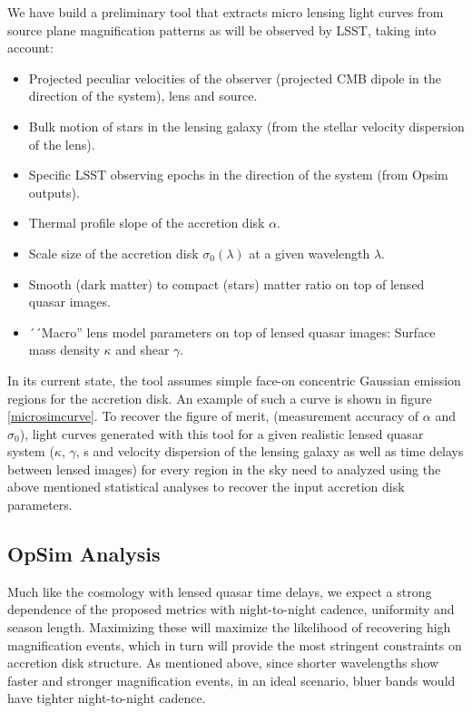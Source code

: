 We have build a preliminary tool that extracts micro lensing light curves from source plane magnification patterns as will be observed by LSST, taking into account:
\begin{itemize}
\item Projected peculiar velocities of the observer (projected CMB dipole in the direction of the system), lens and source.
\item Bulk motion of stars in the lensing galaxy (from the stellar velocity dispersion of the lens).
\item Specific LSST observing epochs in the direction of the system (from Opsim outputs).
\item Thermal profile slope of the accretion disk $\alpha$.
\item Scale size of the accretion disk $\sigma_{0}(\lambda)$ at a given wavelength $\lambda$.
\item Smooth (dark matter) to compact (stars) matter ratio on top of lensed quasar images.
\item ´´Macro'' lens model parameters on top of lensed quasar images: Surface mass density $\kappa$ and shear $\gamma$.
\end{itemize}

\noindent In its current state, the tool assumes simple face-on concentric Gaussian emission regions for the accretion disk. An example of such a curve is shown in figure \ref{microsimcurve}. To recover the figure of merit, (measurement accuracy of $\alpha$ and $\sigma_0$), light curves generated with this tool for a given realistic lensed quasar system ($\kappa$, $\gamma$, s and velocity dispersion of the lensing galaxy as well as time delays between lensed images) for every region in the sky need to analyzed using the above mentioned statistical analyses to recover the input accretion disk parameters.




\subsection{OpSim Analysis}
\label{sec:\secname:analysis}

Much like the cosmology with lensed quasar time delays, we expect a strong
dependence of the proposed metrics with night-to-night cadence, uniformity and
season length. Maximizing these will maximize the likelihood of recovering high
magnification events, which in turn will provide the most stringent constraints
on
accretion disk structure. As mentioned above, since shorter wavelengths show
faster and stronger magnification events, in an ideal scenario, bluer bands would have
tighter night-to-night cadence.

